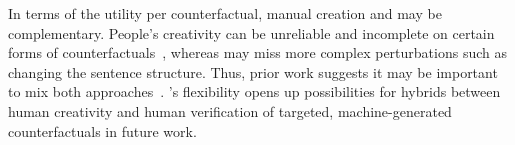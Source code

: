 In terms of the utility per counterfactual, manual creation and \sysname may be complementary. 
People's creativity can be unreliable and incomplete on certain forms of counterfactuals~\cite{ribeiro2018semantically}, whereas \sysname may miss more complex perturbations such as changing the sentence structure.
Thus, prior work suggests it may be important to mix both approaches~\cite{huang2020counterfactually, Khashabi2020MoreBF}.
\sysname's flexibility opens up possibilities for hybrids between human creativity and human verification of targeted, machine-generated counterfactuals in future work.





